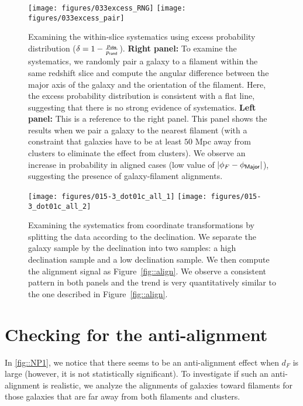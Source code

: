 \documentclass[usenatbib,useAMS]{mnras}
\theoremstyle{remark}
\begin{document}
{{{{{\begin{figure*}
\center
\texttt{[image: figures/033excess\_RNG]}
\texttt{[image: figures/033excess\_pair]}
\caption{
Examining the within-slice systematics using excess probability distribution ($\delta = 1-\frac{p_{\sf obs}}{p_{\sf rand}}$). 
{\bf Right panel:}
To examine the systematics, we randomly pair a galaxy to a filament within the same redshift slice
and compute the angular difference between the major axis of the galaxy and the orientation of the filament.
Here, the excess probability distribution is consistent with a flat line, suggesting that
there is no strong evidence of systematics. 
{\bf Left panel:} This is a reference to the right panel. 
This panel shows the results when we pair a galaxy to the nearest filament
(with a constraint that galaxies have to be at least $50$ Mpc away from clusters to eliminate the effect
from clusters).
We observe an increase in probability in aligned cases (low value of $|\phi_F - \phi_{\sf Major}|$),
suggesting the presence of galaxy-filament alignments.}
\label{fig::check3}
\end{figure*}

\begin{figure*}
\center
\texttt{[image: figures/015-3\_dot01c\_all\_1]}
\texttt{[image: figures/015-3\_dot01c\_all\_2]}
\caption{
Examining the systematics from coordinate transformations by
splitting the data according to the declination. 
We separate the galaxy sample by the declination into two samples:
a high declination sample and a low declination sample.
We then compute the alignment signal as Figure~\ref{fig::align}. 
We observe a consistent pattern in both panels and the trend is very quantitatively 
similar to the one described in Figure~\ref{fig::align}. 
}
\label{fig::check4}
\end{figure*}


\section{Checking for the anti-alignment}	\label{sec::anti}

In \autoref{fig::NP1},
we notice that there seems to be an anti-alignment effect when $d_F$ is large
(however, it is not statistically significant). 
To investigate if such an anti-alignment is realistic, we analyze the alignments of galaxies toward filaments
for those galaxies that are far away from both filaments and clusters. 

}}}}}
\end{document}
